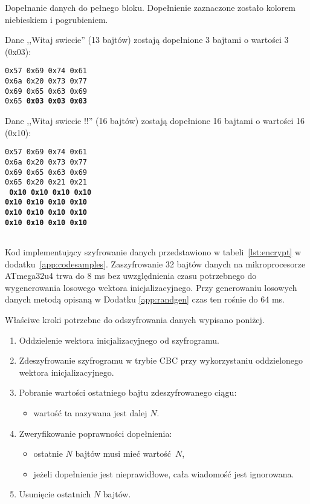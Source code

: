 \begin{table}[th]
\centering
\caption{Dopełnanie danych do pełnego bloku. Dopełnienie zaznaczone zostało kolorem niebieskiem i pogrubieniem.}
{\footnotesize Dane ,,Witaj swiecie'' (13 bajtów) zostają dopełnione 3 bajtami o wartości 3 (0x03):}

\texttt{0x57 0x69 0x74 0x61\\
0x6a 0x20 0x73 0x77\\
0x69 0x65 0x63 0x69\\
0x65 {\color[rgb]{0,0,1}\bfseries 0x03 0x03 0x03}}

{\footnotesize Dane ,,Witaj swiecie !!'' (16 bajtów) zostają dopełnione 16 bajtami o wartości 16 (0x10):}

\texttt{0x57 0x69 0x74 0x61\\
0x6a 0x20 0x73 0x77\\
0x69 0x65 0x63 0x69\\
0x65 0x20 0x21 0x21\\
{\color[rgb]{0,0,1}\bfseries
0x10 0x10 0x10 0x10\\
0x10 0x10 0x10 0x10\\
0x10 0x10 0x10 0x10\\
0x10 0x10 0x10 0x10\\
}
}

\label{tab:padding}
\end{table}

Kod implementujący szyfrowanie danych przedstawiono w tabeli~\ref{lst:encrypt} w dodatku~\ref{app:codesamples}. Zaszyfrowanie 32 bajtów danych na mikroprocesorze ATmega32u4 trwa do 8 ms bez uwzględnienia czasu potrzebnego do wygenerowania losowego wektora inicjalizacyjnego. Przy generowaniu losowych danych metodą opisaną w Dodatku \ref{app:randgen} czas ten rośnie do 64 ms.

Właściwe kroki potrzebne do odszyfrowania danych wypisano poniżej.

\begin{enumerate}
\item Oddzielenie wektora inicjalizacyjnego od szyfrogramu.
\item Zdeszyfrowanie szyfrogramu w trybie CBC przy wykorzystaniu oddzielonego wektora inicjalizacyjnego.
\item Pobranie wartości ostatniego bajtu zdeszyfrowanego ciągu:
\begin{itemize}
    \item wartość ta nazywana jest dalej $ N $.
\end{itemize}
\item Zweryfikowanie poprawności dopełnienia:
\begin{itemize}
    \item ostatnie $ N $ bajtów musi mieć wartość $ N $,
    \item jeżeli dopełnienie jest nieprawidłowe, cała wiadomość jest ignorowana.
\end{itemize}
\item Usunięcie ostatnich $ N $ bajtów.
\end{enumerate}

